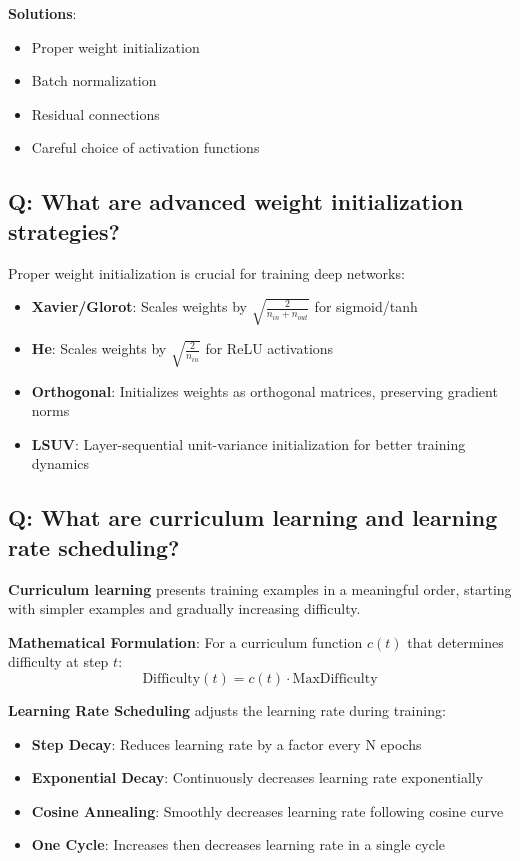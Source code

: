 \textbf{Solutions}:
\begin{itemize}
	\item Proper weight initialization
	\item Batch normalization
	\item Residual connections
	\item Careful choice of activation functions
\end{itemize}

\subsection*{\textcolor{primaryteal}{Q: What are advanced weight initialization strategies?}}
Proper weight initialization is crucial for training deep networks:

\begin{itemize}
	\item \textbf{Xavier/Glorot}: Scales weights by $\sqrt{\frac{2}{n_{in} + n_{out}}}$ for sigmoid/tanh
	\item \textbf{He}: Scales weights by $\sqrt{\frac{2}{n_{in}}}$ for ReLU activations
	\item \textbf{Orthogonal}: Initializes weights as orthogonal matrices, preserving gradient norms
	\item \textbf{LSUV}: Layer-sequential unit-variance initialization for better training dynamics
\end{itemize}

\subsection*{\textcolor{primaryteal}{Q: What are curriculum learning and learning rate scheduling?}}
\textbf{Curriculum learning} presents training examples in a meaningful order, starting with simpler examples and gradually increasing difficulty.

\textbf{Mathematical Formulation}: For a curriculum function \(c(t)\) that determines difficulty at step \(t\):
\[
	\text{Difficulty}(t) = c(t) \cdot \text{MaxDifficulty}
\]

\textbf{Learning Rate Scheduling} adjusts the learning rate during training:
\begin{itemize}
	\item \textbf{Step Decay}: Reduces learning rate by a factor every N epochs
	\item \textbf{Exponential Decay}: Continuously decreases learning rate exponentially
	\item \textbf{Cosine Annealing}: Smoothly decreases learning rate following cosine curve
	\item \textbf{One Cycle}: Increases then decreases learning rate in a single cycle
\end{itemize}

